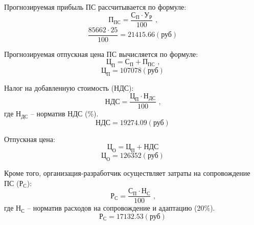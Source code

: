 Прогнозируемая прибыль ПС рассчитывается по формуле:
\begin{equation}
\label{formula:economics:cost:f_pp}
{\text{П}}_{\text{ПС}} = \frac{ {\text{С}}_{\text{П}} \cdot {\text{У}}_{\text{Р}} }{ 100 } \text{ ,}
\end{equation}
$$\frac{ 85662 \cdot 25  }{ 100 } = 21415.66 (\text{руб})$$

Прогнозируемая отпускная цена ПС вычисляется по формуле:
\begin{equation}
\label{formula:economics:cost:f_oprice}
{\text{Ц}}_{\text{П}} = {\text{С}}_{\text{П}} + {\text{П}}_{\text{ПС}} \text{ ,}
\end{equation}
$${\text{Ц}}_{\text{П}} = 107078 (\text{руб})$$

Налог на добавленную стоимость (НДС):
\begin{equation}
\label{formula:economics:cost:f_nds}
{\text{НДС}} = \frac{ {\text{Ц}}_{\text{П}} \cdot {\text{Н}}_{\text{ДС}} }{ 100 } \text{ ,}
\end{equation}
где ${\text{Н}}_{\text{ДС}}$ -- норматив НДС (\%).
$${\text{НДС}} = 19274.09 (\text{руб})$$

Отпускная цена:
\begin{equation}
\label{formula:economics:cost:f_price}
{\text{Ц}}_{\text{О}} = {\text{Ц}}_{\text{П}} + {\text{НДС}}
\end{equation}
$${\text{Ц}}_{\text{О}} = 126352 (\text{руб})$$

Кроме того, организация-разработчик осуществляет затраты на сопровождение ПС (${\text{Р}}_{\text{С}}$):
\begin{equation}
\label{formula:economics:cost:f_sup}
{\text{Р}}_{\text{С}} = \frac{ {\text{С}}_{\text{П}} \cdot {\text{Н}}_{\text{С}} }{ 100 } \text{ ,}
\end{equation}
где ${\text{Н}}_{\text{С}}$ -- норматив расходов на сопровождение и адаптацию (20\%).
$${\text{Р}}_{\text{С}} = 17132.53 (\text{руб})$$

